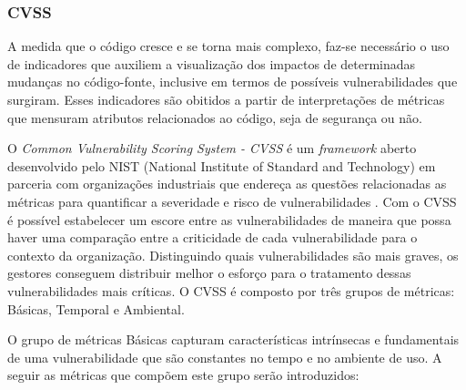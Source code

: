 %

%


\subsubsection{CVSS}

A medida que o código cresce e se torna mais complexo, faz-se necessário o uso de indicadores que auxiliem a visualização dos impactos de determinadas mudanças no código-fonte, inclusive em termos de possíveis vulnerabilidades que surgiram. Esses indicadores são obitidos a partir de interpretações de métricas que mensuram atributos relacionados ao código, seja de segurança ou não. 

O \emph{Common Vulnerability Scoring System - CVSS} é um \emph{framework} aberto desenvolvido pelo NIST (National Institute of Standard and Technology) em parceria com organizações industriais que endereça as questões relacionadas as métricas para quantificar a severidade e risco de vulnerabilidades \cite{cvss2007}. Com o CVSS é possível estabelecer um escore entre as vulnerabilidades de maneira que possa haver uma comparação entre a criticidade de cada vulnerabilidade para o contexto da organização. Distinguindo quais vulnerabilidades são mais graves, os gestores conseguem distribuir melhor o esforço para o tratamento dessas vulnerabilidades mais críticas. O CVSS é composto por três grupos de métricas: Básicas, Temporal e Ambiental.

%

O grupo de métricas Básicas capturam características intrínsecas e fundamentais de uma vulnerabilidade que são constantes no tempo e no ambiente de uso. A seguir as métricas que compõem este grupo serão introduzidos:

